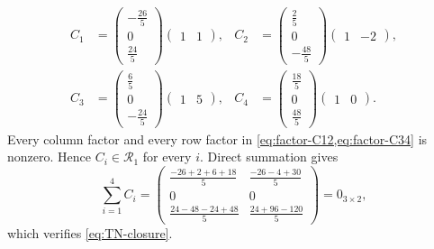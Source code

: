 \documentclass[11pt,reqno]{amsart}
\theoremstyle{definition}
\begin{document}
\begin{align}
  C_1&=
  \begin{pmatrix}-\frac{26}{5}\\[1mm]0\\[1mm]\frac{24}{5}\end{pmatrix}
  \begin{pmatrix}1&1\end{pmatrix},
  &
  C_2&=
  \begin{pmatrix}\frac25\\[1mm]0\\[1mm]-\frac{48}{5}\end{pmatrix}
  \begin{pmatrix}1&-2\end{pmatrix},
  \label{eq:factor-C12}\\[1ex]
  C_3&=
  \begin{pmatrix}\frac65\\[1mm]0\\[1mm]-\frac{24}{5}\end{pmatrix}
  \begin{pmatrix}1&5\end{pmatrix},
  &
  C_4&=
  \begin{pmatrix}\frac{18}{5}\\[1mm]0\\[1mm]\frac{48}{5}\end{pmatrix}
  \begin{pmatrix}1&0\end{pmatrix}.
  \label{eq:factor-C34}
\end{align}
Every column factor and every row factor in
\cref{eq:factor-C12,eq:factor-C34} is nonzero.  Hence
$C_i\in\mathcal R_1$ for every $i$.  Direct summation gives
\begin{equation}
  \sum_{i=1}^4C_i
  =
  \begin{pmatrix}
    \frac{-26+2+6+18}{5}&\frac{-26-4+30}{5}\\
    0&0\\
    \frac{24-48-24+48}{5}&\frac{24+96-120}{5}
  \end{pmatrix}
  =0_{3\times2},
  \label{eq:closure-check}
\end{equation}
which verifies \cref{eq:TN-closure}.
\end{document}
